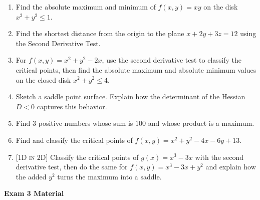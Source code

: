 \documentclass[12pt]{article}
\newcommand{\dimtag}[1]{{\footnotesize\textsc{[#1]}}\;}
\newcounter{topic}
\newcommand{\examhead}[1]{\begin{center}{\large\textbf{#1}}\end{center}}
\begin{document}
\begin{enumerate}
\begin{enumerate}
\begin{center}
        \end{center}
        \item Find the absolute maximum and minimum of $f(x,y)=xy$ on the disk $x^2 + y^2 \le 1$.
        \item Find the shortest distance from the origin to the plane $x + 2y + 3z = 12$ using the Second Derivative Test.
         \item For $f(x,y) = x^2 + y^2 - 2x$, use the second derivative test to classify the critical points, then find the absolute maximum and absolute minimum values on the closed disk $x^2 + y^2 \leq 4$.
        \item Sketch a saddle point surface. Explain how the determinant of the Hessian $D < 0$ captures this behavior.
        \item Find 3 positive numbers whose sum is $100$ and whose product is a maximum.
        \item Find and classify the critical points of $f(x,y)=x^2+y^2-4x-6y+13$.
        \item \dimtag{1D in 2D} Classify the critical points of $g(x)=x^3-3x$ with the second derivative test, then do the same for $f(x,y)=x^3-3x+y^2$ and explain how the added $y^2$ turns the maximum into a saddle.
    \end{enumerate}
\newpage
\setcounter{topic}{\value{enumi}}
\end{enumerate}
\examhead{Exam 3 Material}
\end{document}
